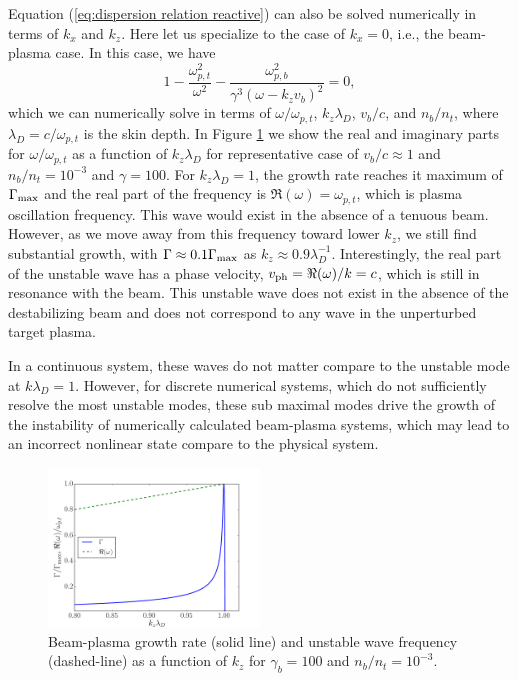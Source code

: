 \documentclass[usenatbib,iop,apj]{emulateapj}
\begin{document}
Equation (\ref{eq:dispersion relation reactive}) can also be solved numerically in terms of $k_x$ and $k_z$.  Here let us specialize to the case of $k_x = 0$, i.e., the beam-plasma case.  In this case, we have 
\begin{equation}\label{eq:dispersion relation beam-plasma}
 1 - \frac{\omega_{p,t}^2}{\omega^2} - \frac{\omega_{p,b}^2}{\gamma^3(\omega-k_z v_b)^2} = 0,
\end{equation}
which we can numerically solve in terms of $\omega/\omega_{p,t}$, $k_z\lambda_D$, $v_b/c$, and $n_b/n_t$, where $\lambda_D = c/\omega_{p,t}$ is the skin depth.  In Figure \ref{fig:OffResonance} we show the real and imaginary parts for $\omega/\omega_{p,t}$ as a function of $k_z\lambda_D$ for representative case of $v_b/c \approx 1$ and $n_b/n_t = 10^{-3}$ and $\gamma=100$.    For $k_z\lambda_D = 1$, the growth rate reaches it maximum of $\Gamma_{\rm max}$ and the real part of the frequency is $\Re(\omega) = \omega_{p,t}$, which is plasma oscillation frequency.  This wave would exist in the absence of a tenuous beam.  However, as we move away from this frequency toward lower $k_z$, we still find substantial growth, with $\Gamma \approx 0.1 \Gamma_{\rm max}$ as $k_z \approx 0.9\lambda_D^{-1}$.  Interestingly, the real part of the unstable wave has a phase velocity, $v_{\rm ph} = \Re(\omega)/k = c$, which is still in resonance with the beam.  This unstable wave does not exist in the absence of the destabilizing beam and does not correspond to any wave in the unperturbed target plasma.  

In a continuous system, these waves do not matter compare to the unstable mode at $k\lambda_D = 1$.   However, for discrete numerical systems, which do not sufficiently resolve the most unstable modes, these sub maximal modes drive the growth of the instability of numerically calculated beam-plasma systems, which may lead to an incorrect nonlinear state compare to the physical system.

\begin{figure}
\includegraphics[width=0.5\textwidth]{off_res.pdf}
\caption{Beam-plasma growth rate (solid line) and unstable wave frequency (dashed-line) as a function of
  $k_z$ for $\gamma_b = 100$ and $n_b/n_t=10^{-3}$. \label{fig:OffResonance}}
\end{figure}
\end{document}
